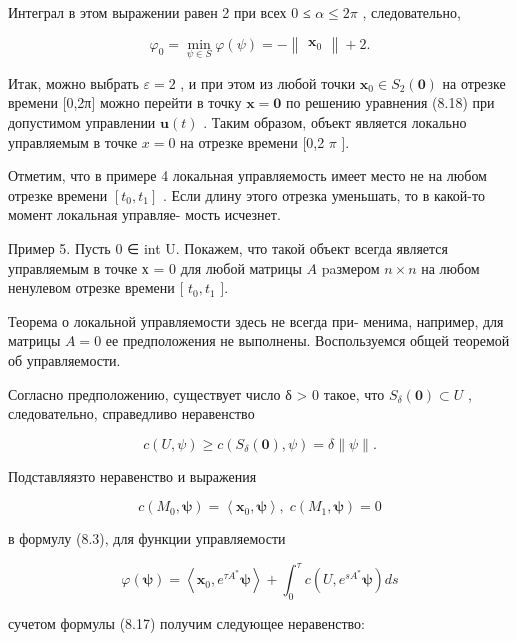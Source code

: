 \documentclass[8pt]{extarticle}
\begin{document}
Интеграл в этом выражении равен 2 при всех 0 ≤ \(\alpha  \leq  {2\pi }\) , следовательно,

\[
{\varphi }_{0} = \mathop{\min }\limits_{{\psi  \in  S}}\varphi \left( \psi \right)  =  - \left\lVert \begin{array}{c} {\mathbf{x}}_{0} \end{array} \right\rVert + 2.
\]

Итак, можно выбрать \(\varepsilon  = 2\) , и при этом из любой точки \({\mathbf{x}}_{0} \in  {S}_{2}\left( \mathbf{0}\right)\) на отрезке времени [0,2π] можно перейти в точку \(\mathbf{x} = \mathbf{0}\) по решению уравнения (8.18) при допустимом управлении \(\mathbf{u}\left( t\right)\) . Таким образом, объект является локально управляемым в точке \(x = 0\) на отрезке времени [0,2 \(\pi\) ].

Отметим, что в примере 4 локальная управляемость имеет место не на любом отрезке времени \(\left\lbrack  {{t}_{0},{t}_{1}}\right\rbrack\) . Если длину этого отрезка уменьшать, то в какой-то момент локальная управляе- мость исчезнет.

Пример 5. Пусть 0 ∈ int U. Покажем, что такой объект всегда является управляемым в точке х = 0 для любой матрицы \(A\) paзмером \(n \times  n\) на любом ненулевом отрезке времени [ \({t}_{0},{t}_{1}\) ].

Теорема о локальной управляемости здесь не всегда при- менима, например, для матрицы \(A = 0\) ее предположения не выполнены. Воспользуемся общей теоремой об управляемости.

Согласно предположению, существует число δ > 0 такое, что \({S}_{\delta }\left( \mathbf{0}\right)  \subset  U\) , следовательно, справедливо неравенство

\[
c\left( {U,\psi }\right)  \geq  c\left( {{S}_{\delta }\left( \mathbf{0}\right) ,\psi }\right)  = \delta \parallel \psi \parallel .
\]

Подставляязто неравенство и выражения

\[
c\left( {{M}_{0},\mathbf{\psi }}\right)  = \left\langle  {{\mathbf{x}}_{0},\mathbf{\psi }}\right\rangle  ,\;c\left( {{M}_{1},\mathbf{\psi }}\right)  = 0
\]

в формулу (8.3), для функции управляемости

\[
\varphi \left( \mathbf{\psi }\right)  = \left\langle  {{\mathbf{x}}_{0},{e}^{\tau {A}^{ * }}\mathbf{\psi }}\right\rangle   + {\int }_{0}^{\tau }c\left( {U,{e}^{s{A}^{ * }}\mathbf{\psi }}\right) {ds}
\]

сучетом формулы (8.17) получим следующее неравенство:
\end{document}
